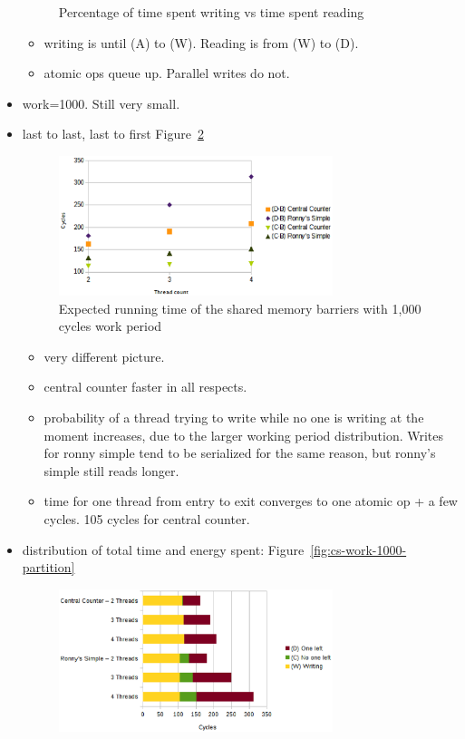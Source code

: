 \documentclass[a4paper, 10pt]{article}
\begin{document}
\begin{itemize}
\begin{figure}[htbp]
			\caption{Percentage of time spent writing vs time spent reading}
			\label{fig:cs-time-work-100-percent}
		\end{figure}
		\begin{itemize}
			\item writing is until (A) to (W). Reading is from (W) to (D).
			\item atomic ops queue up. Parallel writes do not.
		\end{itemize}
	\item work=1000. Still very small.
	\item last to last, last to first Figure~\ref{fig:cs-time-work-1000-B-C-D}
		\begin{figure}[htbp]
			\centering
			\includegraphics[width=8cm]{charts/cs-time-work-1000-B-C-D}
			\caption{Expected running time of the shared memory barriers with 1,000 cycles work period}
			\label{fig:cs-time-work-1000-B-C-D}
		\end{figure}
		\begin{itemize}
			\item very different picture.
			\item central counter faster in all respects.
			\item probability of a thread trying to write while no one is writing at the moment increases, due to the larger working period distribution. Writes for ronny simple tend to be serialized for the same reason, but ronny's simple still reads longer.
			\item time for one thread from entry to exit converges to one atomic op + a few cycles. 105 cycles for central counter.
		\end{itemize}
	\item distribution of total time and energy spent: Figure~\ref{fig:cs-work-1000-partition}
		\begin{figure}[htbp]
			\centering
			\includegraphics[width=8cm]{charts/cs-time-work-1000-partition}

\end{figure}
\end{itemize}
\end{document}
